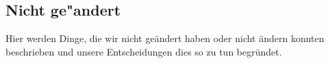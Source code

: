 %



\newpage



\subsection{Nicht ge{"a}ndert}
\label{Abschnitt:Aenderungen:Protokoll:Nicht_behobene_Probleme}

Hier werden Dinge, die wir nicht geändert haben oder nicht ändern konnten beschrieben und unsere Entscheidungen dies so zu tun begründet.



